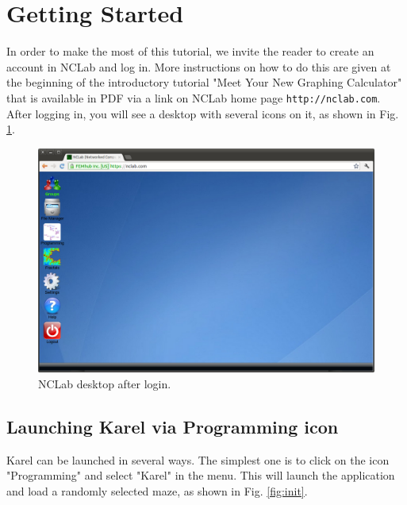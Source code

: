 \documentclass[article,A4,12pt]{llncs}
\begin{document}
\section{Getting Started}

In order to make the most of this tutorial, we invite the 
reader to create an account in NCLab and log in. More instructions 
on how to do this are given at the beginning of the introductory 
tutorial "Meet Your New Graphing Calculator" that is available in 
PDF via a link on NCLab home page {\tt http://nclab.com}.\\

\noindent
After logging in, you will see a desktop with several icons on it,
as shown in Fig. \ref{fig:desktop}. 

\begin{figure}[!ht]
\begin{center}
\includegraphics[width=\textwidth]{img/desktop.png}
\end{center}
\caption{NCLab desktop after login.}
\label{fig:desktop}
\end{figure}

\subsection{Launching Karel via Programming icon}

Karel can be launched in several ways. The simplest one is to click on the icon 
"Programming" and select "Karel" in the menu. This will launch the application 
and load a randomly selected maze, as shown in Fig. \ref{fig:init}.
\end{document}
